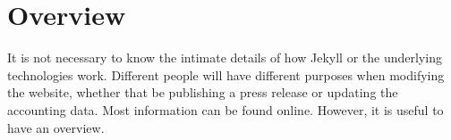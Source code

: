 \chapter{Overview}

It is not necessary to know the intimate details of how Jekyll or the underlying technologies work. Different people will have different purposes when modifying the website, whether that be publishing a press release or updating the accounting data. Most information can be found online. However, it is useful to have an overview.
